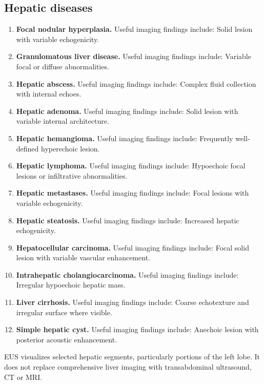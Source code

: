 \subsection{Hepatic diseases}
\begin{enumerate}[leftmargin=*,itemsep=0.45em,topsep=0.4em]
\item \textbf{Focal nodular hyperplasia.} Useful imaging findings include: Solid lesion with variable echogenicity.
\item \textbf{Granulomatous liver disease.} Useful imaging findings include: Variable focal or diffuse abnormalities.
\item \textbf{Hepatic abscess.} Useful imaging findings include: Complex fluid collection with internal echoes.
\item \textbf{Hepatic adenoma.} Useful imaging findings include: Solid lesion with variable internal architecture.
\item \textbf{Hepatic hemangioma.} Useful imaging findings include: Frequently well-defined hyperechoic lesion.
\item \textbf{Hepatic lymphoma.} Useful imaging findings include: Hypoechoic focal lesions or infiltrative abnormalities.
\item \textbf{Hepatic metastases.} Useful imaging findings include: Focal lesions with variable echogenicity.
\item \textbf{Hepatic steatosis.} Useful imaging findings include: Increased hepatic echogenicity.
\item \textbf{Hepatocellular carcinoma.} Useful imaging findings include: Focal solid lesion with variable vascular enhancement.
\item \textbf{Intrahepatic cholangiocarcinoma.} Useful imaging findings include: Irregular hypoechoic hepatic mass.
\item \textbf{Liver cirrhosis.} Useful imaging findings include: Coarse echotexture and irregular surface where visible.
\item \textbf{Simple hepatic cyst.} Useful imaging findings include: Anechoic lesion with posterior acoustic enhancement.
\end{enumerate}
EUS visualizes selected hepatic segments, particularly portions of the left lobe. It does not replace comprehensive liver imaging with transabdominal ultrasound, CT or MRI.

